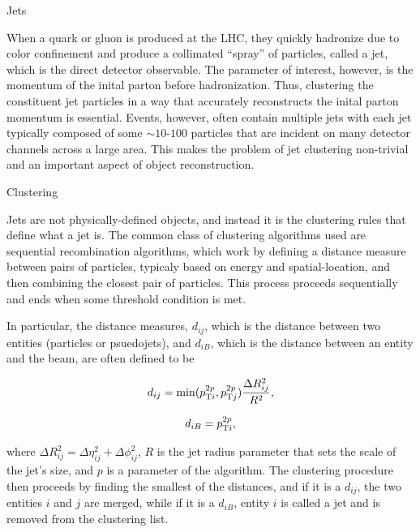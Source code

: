 \begin{section}{Jets}

When a quark or gluon is produced at the LHC, they quickly hadronize due to color confinement and produce a collimated ``spray'' of particles, called a jet, which is the direct detector observable.
The parameter of interest, however, is the momentum of the inital parton before hadronization.
Thus, clustering the constituent jet particles in a way that accurately reconstructs the inital parton momentum is essential.
Events, however, often contain multiple jets with each jet typically composed of some $\sim$$10$-$100$ particles that are incident on many detector channels across a large area.
This makes the problem of jet clustering non-trivial and an important aspect of object reconstruction.

\begin{subsection}{Clustering}

Jets are not physically-defined objects, and instead it is the clustering rules that define what a jet is.
The common class of clustering algorithms used are sequential recombination algorithms, which work by defining a distance measure between pairs of particles, typicaly based on energy and spatial-location, and then combining the closest pair of particles.
This process proceeds sequentially and ends when some threshold condition is met.

In particular, the distance measures, $d_{ij}$, which is the distance between two entities (particles or psuedojets), and $d_{iB}$, which is the distance between an entity and the beam, are often defined to be

\begin{equation}
d_{ij} = \mathrm{min}(p_{\mathrm{T}i}^{2p},p_{\mathrm{T}j}^{2p})\frac{\Delta R_{ij}^{2}}{R^2},
\label{clustering_dij}
\end{equation}

\begin{equation}
d_{iB} = p_{\mathrm{T}i}^{2p},
\label{clustering_diB}
\end{equation}

where $\Delta R_{ij}^{2} = \Delta \eta_{ij}^{2} + \Delta \phi_{ij}^2$, $R$ is the jet radius parameter that sets the scale of the jet's size, and $p$ is a parameter of the algorithm.
The clustering procedure then proceeds by finding the smallest of the distances, and if it is a $d_{ij}$, the two entities $i$ and $j$ are merged, while if it is a $d_{iB}$, entity $i$ is called a jet and is removed from the clustering list.


\end{subsection}
\end{section}
